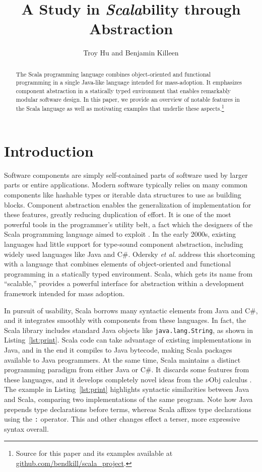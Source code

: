 \documentclass[jou,apacite]{IEEEtran}
\title{A Study in \emph{Scala}bility through Abstraction}
\author{Troy Hu and Benjamin Killeen} %
\begin{document}
\maketitle    

\begin{abstract}
  The Scala programming language combines object-oriented and functional
  programming in a single Java-like language intended for mass-adoption. It
  emphasizes component abstraction in a statically typed environment that
  enables remarkably modular software design. In this paper, we provide an
  overview of notable features in the Scala language as well as motivating
  examples that underlie these aspects.\footnote{Source for this paper and its
    examples available at \href{https://github.com/bendkill/scala_project}
    {github.com/bendkill/scala\_project}.}
\end{abstract}                     

\section{Introduction}
\label{sec:intro}

Software components are simply self-contained parts of software used by larger
parts or entire applications. Modern software typically relies on many common
components like hashable types or iterable data structures to use as building
blocks. Component abstraction enables the generalization of implementation for
these features, greatly reducing duplication of effort. It is one of the most
powerful tools in the programmer's utility belt, a fact which the designers of
the Scala programming language aimed to exploit \cite{odersky2004overview}. In
the early 2000s, existing languages had little support for type-sound component
abstraction, including widely used languages like Java and C\#. Odersky \emph{et
  al.} address this shortcoming with a language that combines elements of
object-oriented and functional programming in a statically typed
environment. Scala, which gets its name from ``scalable,'' provides a powerful
interface for abstraction within a development framework intended for mass
adoption.

In pursuit of usability, Scala borrows many syntactic elements from Java and
C\#, and it integrates smoothly with components from these languages. In fact,
the Scala library includes standard Java objects like \texttt{java.lang.String},
as shown in Listing~\ref{lst:print}. Scala code can take advantage of existing
implementations in Java, and in the end it compiles to Java bytecode, making
Scala packages available to Java programmers. At the same time, Scala maintains
a distinct programming paradigm from either Java or C\#. It discards some
features from these languages, and it develops completely novel ideas from the
$\nu$Obj calculus \cite{odersky_nominal_2003}. The example in
Listing~\ref{lst:print} highlights syntactic similarities between Java and Scala,
comparing two implementations of the same program. Note how Java prepends type
declarations before terms, whereas Scala affixes type declarations using the
\texttt{:} operator. This and other changes effect a terser, more expressive
syntax overall.
\end{document}
